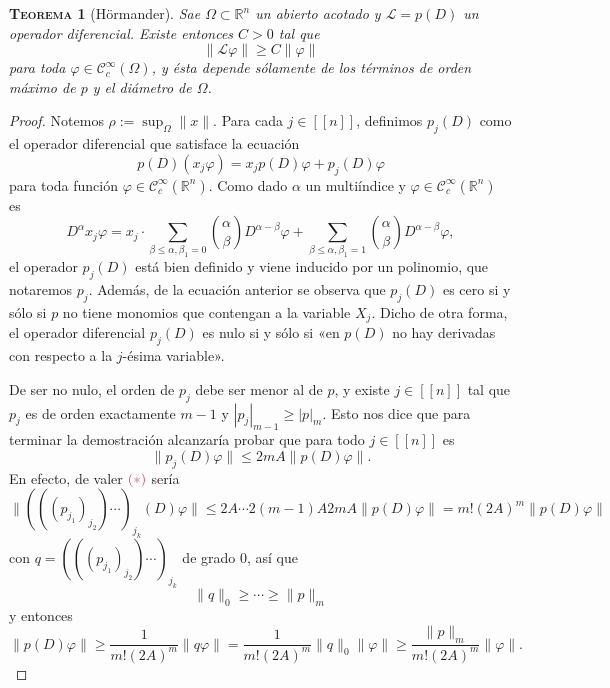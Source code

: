\documentclass[11pt]{article}
\theoremstyle{colored}
\newtheorem{theorem}{\scshape Teorema}
\newcommand{\R}{\mathbb{R}}
\newcommand{\C}{\mathscr{C}}
\newcommand{\nat}[1]{[\![#1]\!]}
\newcommand{\guill}[1]{«#1»}
\renewcommand{\L}{\mathscr{L}}
\newcommand{\paint}[1]{\color{color}{#1}}
\newcommand{\tpaint}[1]{\paint{\textbf{#1}}}
\begin{document}
\begin{theorem}[Hörmander] Sae $\Omega \subset \R^n$ un abierto acotado y $\L = p(D)$ un operador diferencial. Existe entonces $C > 0$ tal que
\[
\|\L\varphi\| \geq C\|\varphi\|
\]
para toda $\varphi \in \mathscr{C}_c^\infty(\Omega)$, y ésta depende sólamente de los términos de orden máximo de $p$ y el diámetro de $\Omega$.
\end{theorem}
\begin{proof} Notemos $\rho := \sup_{\Omega}\|x\|$. Para cada $j \in \nat{n}$, definimos $p_j(D)$ como el operador diferencial que satisface la ecuación
\[
p(D)(x_j\varphi) = x_jp(D)\varphi + p_j(D)\varphi
\]
para toda función $\varphi \in \C_c^\infty(\R^n)$. Como dado $\alpha$ un multiíndice y $\varphi \in \C_c^\infty(\R^n)$ es
\[
D^\alpha x_j\varphi = x_j \cdot \sum_{\beta \leq \alpha, \beta_1 = 0} {\alpha \choose \beta} D^{\alpha - \beta}\varphi + \sum_{\beta \leq \alpha, \beta_1 = 1} {\alpha \choose \beta}D^{\alpha - \beta}\varphi,
\]
el operador $p_j(D)$ está bien definido y viene inducido por un polinomio, que notaremos $p_j$. Además, de la ecuación anterior se observa que $p_j(D)$ es cero si y sólo si $p$ no tiene monomios que contengan a la variable $X_j$. Dicho de otra forma, el operador diferencial $p_j(D)$ es nulo si y sólo si \guill{en $p(D)$ no hay derivadas con respecto a la $j$-ésima variable}.

De ser no nulo, el orden de $p_j$ debe ser menor al de $p$, y existe $j \in \nat{n}$ tal que $p_j$ es de orden exactamente $m-1$ y $|p_j|_{m-1} \geq |p|_m$. Esto nos dice que para terminar la demostración alcanzaría probar que para todo $j \in \nat{n}$ es
\[
\|p_j(D)\varphi\| \leq 2mA\|p(D)\varphi\| \tag{$\ast$}.
\]
En efecto, de valer $\tpaint{$(\ast)$}$ sería
\[
\|(((p_{j_1})_{j_2})\cdots)_{j_k}(D)\varphi\| \leq 2A \cdots 2(m-1)A2mA\|p(D)\varphi\| = m!(2A)^m \|p(D)\varphi\|
\]
con $q = (((p_{j_1})_{j_2})\cdots)_{j_k}$ de grado $0$, así que
\[
\|q\|_0 \geq \cdots \geq \|p\|_m
\]
y entonces
\[
\|p(D)\varphi\| \geq \frac{1}{m!(2A)^m}\|q\varphi\| = \frac{1}{m!(2A)^m}\|q\|_0 \|\varphi\| \geq \frac{\|p\|_m}{m!(2A)^m}\|\varphi\|. 
\]



\end{proof}
\end{document}
